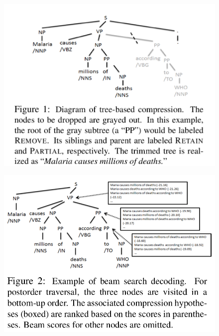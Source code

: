 \documentclass[xcolor={table}]{beamer}
\begin{document}
\begin{frame}{\cite{wang2013sentence}}
    \begin{figure}[h]
\centering
    \includegraphics[scale=.27]{images/figure1-wang13} 
\end{figure}
\end{frame}
\begin{frame}{\cite{wang2013sentence}}
    \begin{figure}[h]
\centering
    \includegraphics[scale=.3]{images/figure2-wang13} 
\end{figure}
\end{frame}
\end{document}
